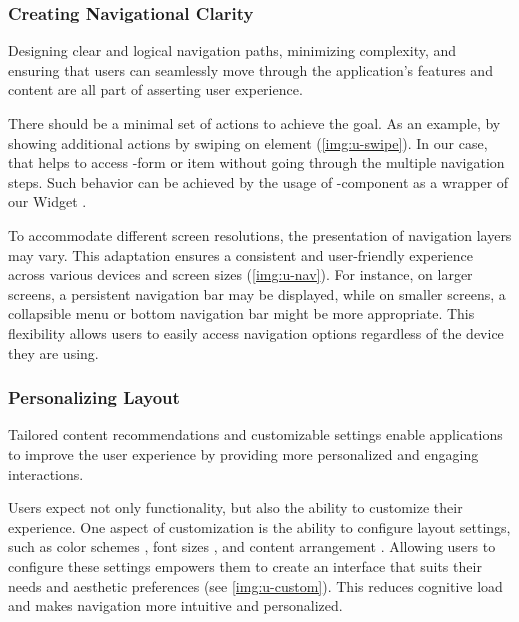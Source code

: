 \subsubsection{Creating Navigational Clarity} 

Designing clear and logical navigation paths, minimizing complexity, and ensuring that users can seamlessly move through 
the application's features and content are all part of asserting user experience.

There should be a minimal set of actions to achieve the goal. As an example, by showing additional actions by swiping 
on element (\cref{img:u-swipe}). In our case, that helps to access -form or  item without going 
through the multiple navigation steps. Such behavior can be achieved by the usage of 
-component as a wrapper of our Widget .

To accommodate different screen resolutions, the presentation of navigation layers may vary. This adaptation ensures a 
consistent and user-friendly experience across various devices and screen sizes (\cref{img:u-nav}). For instance, on 
larger screens, a persistent navigation bar may be displayed, while on smaller screens, a collapsible menu or bottom 
navigation bar might be more appropriate. This flexibility allows users to easily access navigation options regardless 
of the device they are using.




\subsubsection{Personalizing Layout}

Tailored content recommendations and customizable settings enable applications to improve the user experience by 
providing more personalized and engaging interactions.

Users expect not only functionality, but also the ability to customize their experience. One aspect of customization is 
the ability to configure layout settings, such as color schemes , font sizes , and content 
arrangement . Allowing users to configure these settings empowers them to create an interface that suits 
their needs and aesthetic preferences (see \cref{img:u-custom}). This reduces cognitive load and makes navigation more 
intuitive and personalized.

